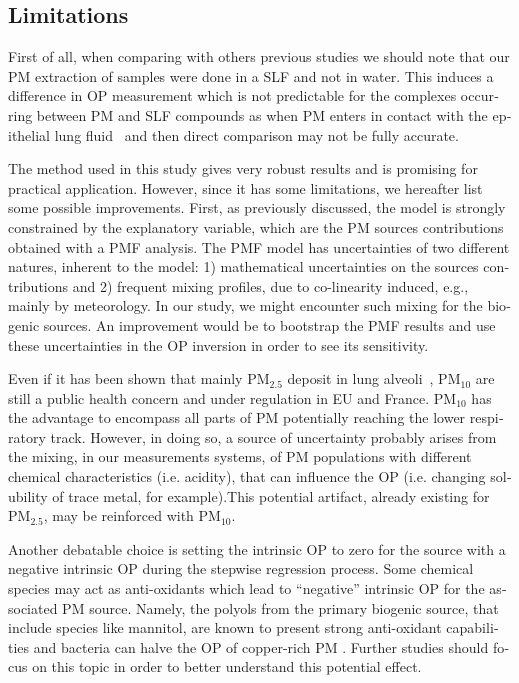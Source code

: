 \begin{otherlanguage}{english}
\section{Limitations}\label{limitations}

First of all, when comparing with others previous studies we should note that
our PM extraction of samples were done in a SLF and not in water. This induces a
difference in OP measurement which is not predictable for the complexes occurring
between PM and SLF compounds as when PM enters in contact with the epithelial
lung fluid~\parencite{calasImportance2017} and then direct comparison may not be
fully accurate.

The method used in this study gives very robust results and is promising for
practical application. However, since it has some limitations, we hereafter list
some possible improvements. First, as previously discussed, the model is
strongly constrained by the explanatory variable, which are the PM sources
contributions obtained with a PMF analysis. The PMF model has uncertainties of
two different natures, inherent to the model: 1) mathematical uncertainties on
the sources contributions and 2) frequent mixing profiles, due to co-linearity
induced, e.g., mainly by meteorology. In our study, we might encounter such
mixing for the biogenic sources. An improvement would be to bootstrap the PMF
results and use these uncertainties in the OP inversion in order to see its
sensitivity.

Even if it has been shown that mainly PM$_{2.5}$ deposit in lung
alveoli~\parencite{fangHighly2017}, PM$_{10}$ are still a public health concern and
under regulation in EU and France. PM$_{10}$ has the advantage to encompass all parts
of PM potentially reaching the lower respiratory track. However, in doing so, a
source of uncertainty probably arises from the mixing, in our measurements
systems, of PM populations with different chemical characteristics (i.e.
acidity), that can influence the OP (i.e. changing solubility of trace metal,
for example).This potential artifact, already existing for PM$_{2.5}$, may be
reinforced with PM$_{10}$.

Another debatable choice is setting the intrinsic OP to zero for the source with
a negative intrinsic OP during the stepwise regression process. Some chemical
species may act as anti-oxidants which lead to ``negative'' intrinsic OP for the
associated PM source. Namely, the polyols from the primary biogenic source, that
include species like mannitol, are known to present strong anti-oxidant
capabilities \parencite{liuTherapeutic2010} and bacteria can halve the OP of
copper-rich PM \parencite{samakeUnexpected2017}. Further studies should focus on
this topic in order to better understand this potential effect.


\end{otherlanguage}
